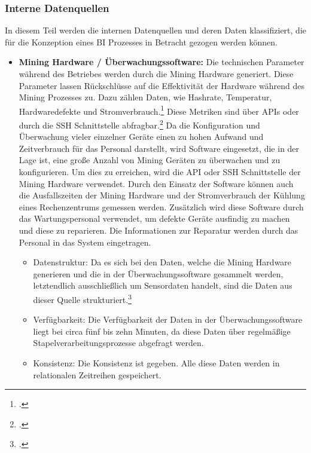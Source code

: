 \subsubsection{Interne Datenquellen} \label{toc:internedatenquellen}

In diesem Teil werden die internen Datenquellen und deren Daten klassifiziert, die für die Konzeption eines \ac{BI} Prozesses
in Betracht gezogen werden können.

\begin{itemize}
    \item \textbf{Mining Hardware / Überwachungssoftware: }
    Die technischen Parameter während des Betriebes werden durch die Mining Hardware generiert. Diese Parameter lassen
    Rückschlüsse auf die Effektivität der Hardware während des Mining Prozesses zu. Dazu zählen Daten, wie Hashrate, Temperatur,
    Hardwaredefekte und Stromverbrauch.\footcite[Vgl.][S. 12]{antminer2021manual} Diese Metriken sind über \acp{API} oder
    durch die \ac{SSH} Schnittstelle abfragbar.\footcite[Vgl.][]{awesomeminer2021api} Da die Konfiguration und Überwachung
    vieler einzelner Geräte einen zu hohen Aufwand und Zeitverbrauch für das Personal darstellt, wird Software eingesetzt,
    die in der Lage ist, eine große Anzahl von Mining Geräten zu überwachen und zu konfigurieren. Um dies zu erreichen, wird
    die \ac{API} oder \ac{SSH} Schnittstelle der Mining Hardware verwendet. Durch den Einsatz der Software können auch die
    Ausfallszeiten der Mining Hardware und der Stromverbrauch der Kühlung eines Rechenzentrums gemessen werden. Zusätzlich
    wird diese Software durch das Wartungspersonal verwendet, um defekte Geräte ausfindig zu machen und diese zu reparieren.
    Die Informationen zur Reparatur werden durch das Personal in das System eingetragen.
    \begin{itemize}
        \item Datenstruktur: Da es sich bei den Daten, welche die Mining Hardware generieren und die in der Überwachungssoftware
        gesammelt werden, letztendlich ausschließlich um Sensordaten handelt, sind die Daten aus dieser Quelle
        strukturiert.\footcite[Vgl.][S. 27]{kimble2015big}
        \item Verfügbarkeit: Die Verfügbarkeit der Daten in der Überwachungssoftware liegt bei circa fünf bis zehn Minuten,
        da diese Daten über regelmäßige Stapelverarbeitungsprozesse abgefragt werden.
        \item Konsistenz: Die Konsistenz ist gegeben. Alle diese Daten werden in relationalen Zeitreihen gespeichert. 

\end{itemize}
\end{itemize}
